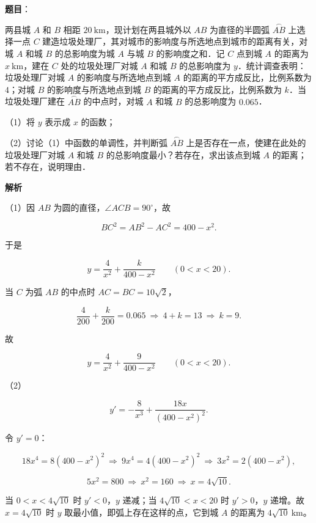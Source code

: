 \begin{answer}

\textbf{题目}：

两县城 $A$ 和 $B$ 相距 $20\ \mathrm{km}$，现计划在两县城外以 $AB$ 为直径的半圆弧 $\overset{\frown}{AB}$ 上选择一点 $C$ 建造垃圾处理厂，其对城市的影响度与所选地点到城市的距离有关，对城 $A$ 和城 $B$ 的总影响度为城 $A$ 与城 $B$ 的影响度之和．记 $C$ 点到城 $A$ 的距离为 $x\ \mathrm{km}$，建在 $C$ 处的垃圾处理厂对城 $A$ 和城 $B$ 的总影响度为 $y$．统计调查表明：垃圾处理厂对城 $A$ 的影响度与所选地点到城 $A$ 的距离的平方成反比，比例系数为 $4$；对城 $B$ 的影响度与所选地点到城 $B$ 的距离的平方成反比，比例系数为 $k$．当垃圾处理厂建在 $\overset{\frown}{AB}$ 的中点时，对城 $A$ 和城 $B$ 的总影响度为 $0.065$．

（1）将 $y$ 表示成 $x$ 的函数；

（2）讨论（1）中函数的单调性，并判断弧 $\overset{\frown}{AB}$ 上是否存在一点，使建在此处的垃圾处理厂对城 $A$ 和城 $B$ 的总影响度最小？若存在，求出该点到城 $A$ 的距离；若不存在，说明理由．

\textbf{解析}

（1）因 $AB$ 为圆的直径，$\angle ACB=90^\circ$，故

\nopagebreak[4]
\[BC^2=AB^2-AC^2=400-x^2 .\]

于是

\nopagebreak[4]
\[y=\frac{4}{x^2}+\frac{k}{400-x^2}\qquad(0<x<20).\]

当 $C$ 为弧 $AB$ 的中点时 $AC=BC=10\sqrt2$，

\nopagebreak[4]
\[\frac{4}{200}+\frac{k}{200}=0.065\ \Longrightarrow\ 4+k=13\ \Longrightarrow\ k=9 .\]

故

\nopagebreak[4]
\[y=\frac{4}{x^2}+\frac{9}{400-x^2}\qquad(0<x<20).\]

（2）

\nopagebreak[4]
\[y'=-\frac{8}{x^3}+\frac{18x}{(400-x^2)^2}.\]

令 $y'=0$：

\nopagebreak[4]
\[18x^4=8(400-x^2)^2\ \Longrightarrow\ 9x^4=4(400-x^2)^2\ \Longrightarrow\ 3x^2=2(400-x^2),\]

\nopagebreak[4]
\[5x^2=800\ \Longrightarrow\ x^2=160\ \Longrightarrow\ x=4\sqrt{10}.\]

当 $0<x<4\sqrt{10}$ 时 $y'<0$，$y$ 递减；当 $4\sqrt{10}<x<20$ 时 $y'>0$，$y$ 递增。故 $x=4\sqrt{10}$ 时 $y$ 取最小值，即弧上存在这样的点，它到城 $A$ 的距离为 $4\sqrt{10}\ \mathrm{km}$。


\end{answer}
